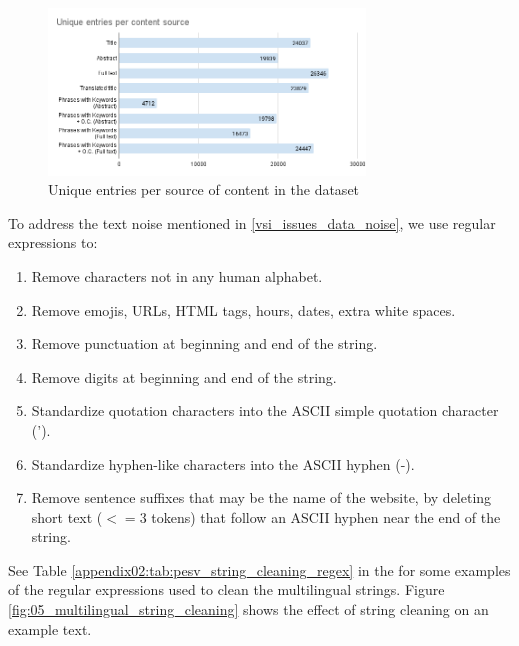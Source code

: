 \begin{figure}
    \centering
    \includegraphics[width=0.750\textwidth]{Figures/05/Unique entries per content source_keyphrases.png}
    \caption{Unique entries per source of content in the \VSI{} dataset}
    \label{fig:05_unique_entries_keyphrases_vsi}
\end{figure}


\label{vsi_data_cleaning}


\label{vsi_string_cleaning}

To address the text noise mentioned in \headerName{} \ref{vsi_issues_data_noise}, we use regular expressions to:

\begin{enumerate}
    \item Remove characters not in any human alphabet.
    \item Remove emojis, URLs, HTML tags, hours, dates, extra white spaces.
    \item Remove punctuation at beginning and end of the string.
    \item Remove digits at beginning and end of the string.
    \item Standardize quotation characters into the ASCII simple quotation character (').
    \item Standardize hyphen-like characters into the ASCII hyphen (-).
    \item Remove sentence suffixes that may be the name of the website, by deleting short text ($<=3$ tokens) that follow an ASCII hyphen near the end of the string.
\end{enumerate}

See Table \ref{appendix02:tab:pesv_string_cleaning_regex} in the \appendixname{} for some examples of the regular expressions used to clean the multilingual strings. Figure \ref{fig:05_multilingual_string_cleaning} shows the effect of string cleaning on an example text.

